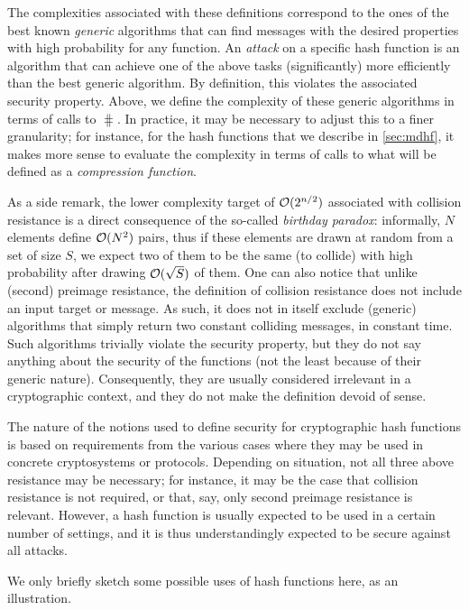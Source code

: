 The complexities associated with these definitions correspond to the ones of the best known \emph{generic} algorithms that can find messages with the desired
properties with high probability for any function. An \emph{attack} on a specific hash function is an algorithm that can achieve one of the above tasks (significantly)
more efficiently than the best generic algorithm. By definition, this violates the associated security property.
Above, we define the complexity of these generic algorithms in terms of calls to $\hash$. In practice, it may be necessary to adjust
this to a finer granularity; for instance, for the \merkdam hash functions that we describe in \autoref{sec:mdhf}, it makes more sense to evaluate the complexity
in terms of calls to what will be defined as a \emph{compression function}.

As a side remark, the lower complexity target of $\operatorname{\mathcal{O}}(2^{n/2})$ associated with collision resistance is a direct consequence of the so-called \emph{birthday paradox}: informally,
$N$ elements define $\operatorname{\mathcal{O}}(N^2)$ pairs, thus if these elements are drawn at random from a set of size $S$, we expect two of them to be the same (\ie to collide)
with high probability after drawing $\operatorname{\mathcal{O}}(\sqrt{S})$ of them.
One can also notice that unlike (second) preimage resistance, the definition of collision resistance does not include an input target or message. As such, it does not in itself
exclude (generic) algorithms that simply return two constant colliding messages, in constant time. Such algorithms trivially violate the security property, but
they do not say anything about the security of the functions (not the least because of their generic nature). Consequently, they are usually considered irrelevant in a cryptographic context, and they do not make
the definition devoid of sense.

\bigskip

The nature of the notions used to define security for cryptographic hash functions is based on requirements from the various cases where they may be used in concrete cryptosystems or protocols.
Depending on situation, not all three above resistance may be necessary; for instance, it may be the case that collision resistance is not required, or that, say, only second preimage resistance
is relevant. However, a hash function is usually expected to be used in a certain number of settings, and it is thus understandingly expected to be secure against all attacks.

We only briefly sketch some possible uses of hash functions here, as an illustration.

